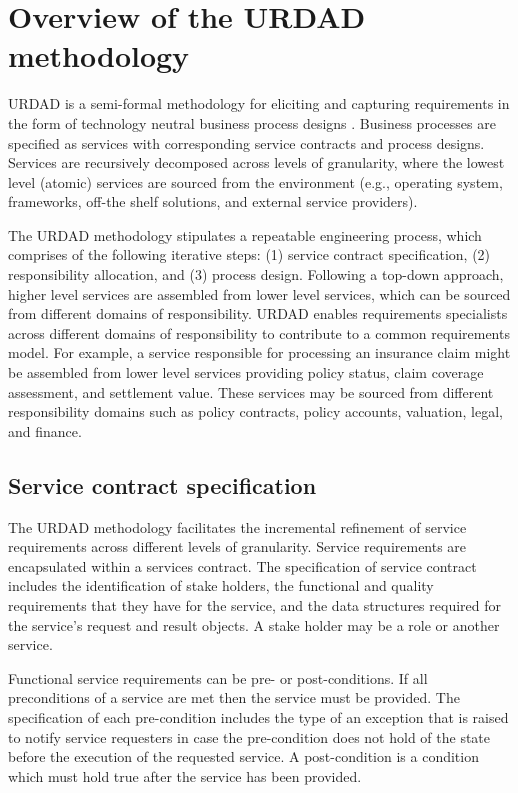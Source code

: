 \section{Overview of the URDAD methodology \label{sec:urdadMethodology}}

URDAD is a semi-formal methodology for eliciting and capturing requirements in the form of technology neutral business process designs \cite{solms_urdad_2010}. Business processes are specified as services with corresponding service contracts and process designs. Services are recursively decomposed across levels of granularity, where the lowest level (atomic) services are sourced from the environment (e.g., operating system, frameworks, off-the shelf solutions, and external service providers). 

The URDAD methodology stipulates a repeatable engineering process, which comprises of the following iterative steps: (1) service contract specification, (2) responsibility allocation, and (3) process design. Following a top-down approach, higher level services are assembled from lower level services, which can be sourced from different domains of responsibility. URDAD enables requirements specialists across different domains of responsibility to contribute to a common requirements model. For example, a service responsible for processing an insurance claim might be assembled from lower level services providing policy status, claim coverage assessment, and settlement value. These services may be sourced from different responsibility domains such as policy contracts, policy accounts, valuation, legal, and finance. 

\subsection{Service contract specification}

The URDAD methodology facilitates the incremental refinement of service requirements across different levels of granularity. Service requirements are encapsulated within a services contract. The specification of service contract includes the identification of stake holders, the functional and quality requirements that they have for the service, and the data structures required for the service's request and result objects. A stake holder may be a role or another service.

Functional service requirements can be pre- or post-conditions. If all preconditions of a service are met then the service must be provided. The specification of each pre-condition includes the type of an exception that is raised to notify service requesters in case the pre-condition does not hold of the state before the execution of the requested service. A post-condition is a condition which must hold true after the service has been provided.

